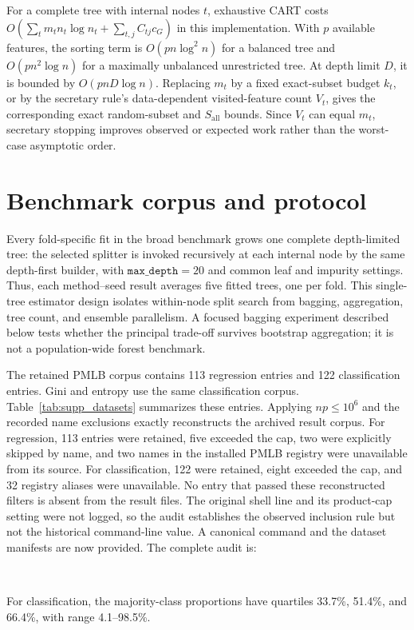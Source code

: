 \documentclass[final,5p,times,twocolumn]{elsarticle}
\begin{document}
For a complete tree with internal nodes \(t\), exhaustive CART costs
\(O(\sum_t m_tn_t\log n_t+\sum_{t,j}C_{tj}c_G)\) in this implementation.
With \(p\) available features, the sorting term is \(O(pn\log^2 n)\) for a
balanced tree and \(O(pn^2\log n)\) for a maximally unbalanced unrestricted
tree.  At depth limit \(D\), it is bounded by \(O(pnD\log n)\).  Replacing
\(m_t\) by a fixed exact-subset budget \(k_t\), or by the secretary rule's
data-dependent visited-feature count \(V_t\), gives the corresponding exact
random-subset and \(S_{\mathrm{all}}\) bounds.  Since \(V_t\) can equal
\(m_t\), secretary stopping improves observed or expected work rather than
the worst-case asymptotic order.

\section{Benchmark corpus and protocol}
\label{sec:supp_benchmark}

Every fold-specific fit in the broad benchmark grows one complete depth-limited tree: the selected
splitter is invoked recursively at each internal node by the same depth-first
builder, with \(\texttt{max\_depth}=20\) and common leaf and impurity settings.
Thus, each method--seed result averages five fitted trees, one per fold.  This
single-tree estimator design isolates within-node split search from bagging,
aggregation, tree count, and ensemble parallelism.  A focused bagging
experiment described below tests whether the principal trade-off survives
bootstrap aggregation; it is not a population-wide forest benchmark.

The retained PMLB corpus contains 113 regression entries and 122 classification
entries.  Gini and entropy use the same classification corpus.
Table~\ref{tab:supp_datasets} summarizes these entries.  Applying
\(np\leq10^6\) and the recorded name exclusions exactly reconstructs the
archived result corpus.  For regression, 113 entries were retained, five exceeded
the cap, two were explicitly skipped by name, and two names in the installed
PMLB registry were unavailable from its source.  For classification, 122 were
retained, eight exceeded the cap, and 32 registry aliases were unavailable.
No entry that passed these reconstructed filters is absent from the result
files.  The original shell line and its product-cap setting were not logged, so
the audit establishes the observed inclusion rule but not the historical
command-line value.  A canonical command and the dataset manifests are now
provided.  The complete audit is:
\begin{center}
\footnotesize
{}\\[-2pt]
\end{center}
\noindent For classification, the
majority-class proportions have quartiles 33.7\%, 51.4\%, and 66.4\%, with
range 4.1--98.5\%.
\end{document}
